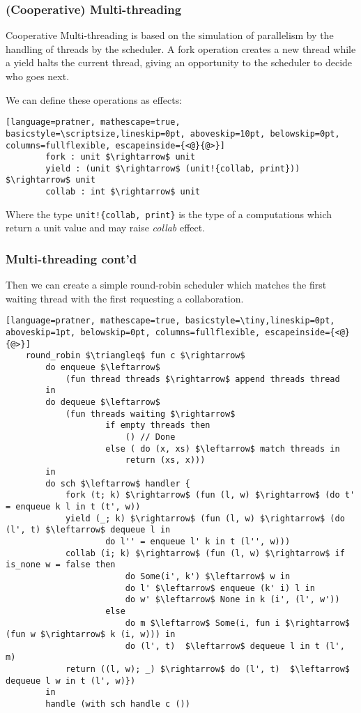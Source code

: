 \documentclass[t]{beamer}
\begin{document}
\begin{frame}[fragile]
	\frametitle{(Cooperative) Multi-threading}
	
	Cooperative Multi-threading is based on the simulation of parallelism by the handling of threads by the scheduler. 
	A \alert{fork} operation creates a new thread while a \alert{yield} halts the current thread, giving an opportunity to the scheduler to decide who goes next.
		
	We can define these operations as effects:
	
	\begin{lstlisting}[language=pratner, mathescape=true, basicstyle=\scriptsize,lineskip=0pt, aboveskip=10pt, belowskip=0pt, columns=fullflexible, escapeinside={<@}{@>}]
		fork : unit $\rightarrow$ unit
		yield : (unit $\rightarrow$ (unit!{collab, print})) $\rightarrow$ unit
		collab : int $\rightarrow$ unit
	\end{lstlisting}  
	
	
		Where the type \verb|unit!{collab, print}| is the type of a computations which return a unit value and may raise \textit{collab} effect.
		
\end{frame}

\begin{frame}[fragile]
	\frametitle{Multi-threading cont'd}
	
	Then we can create a simple round-robin scheduler which matches the first waiting thread with the first requesting a collaboration.
	
	\begin{lstlisting}[language=pratner, mathescape=true, basicstyle=\tiny,lineskip=0pt, aboveskip=1pt, belowskip=0pt, columns=fullflexible, escapeinside={<@}{@>}]
	round_robin $\triangleq$ fun c $\rightarrow$ 
		do enqueue $\leftarrow$ 
			(fun thread threads $\rightarrow$ append threads thread 
		in 
		do dequeue $\leftarrow$
			(fun threads waiting $\rightarrow$
					if empty threads then 
						() // Done
					else ( do (x, xs) $\leftarrow$ match threads in 
						return (xs, x)))
		in
		do sch $\leftarrow$ handler {
			fork (t; k) $\rightarrow$ (fun (l, w) $\rightarrow$ (do t' = enqueue k l in t (t', w))
			yield (_; k) $\rightarrow$ (fun (l, w) $\rightarrow$ (do (l', t) $\leftarrow$ dequeue l in 
					do l'' = enqueue l' k in t (l'', w)))
			collab (i; k) $\rightarrow$ (fun (l, w) $\rightarrow$ if is_none w = false then
					    do Some(i', k') $\leftarrow$ w in 
					    do l' $\leftarrow$ enqueue (k' i) l in 
					    do w' $\leftarrow$ None in k (i', (l', w'))
					else 
					    do m $\leftarrow$ Some(i, fun i $\rightarrow$ (fun w $\rightarrow$ k (i, w))) in 
					    do (l', t)  $\leftarrow$ dequeue l in t (l', m)
			return ((l, w); _) $\rightarrow$ do (l', t)  $\leftarrow$ dequeue l w in t (l', w)})
		in 
		handle (with sch handle c ())
		
	\end{lstlisting}  
	
	
\end{frame}
\end{document}
